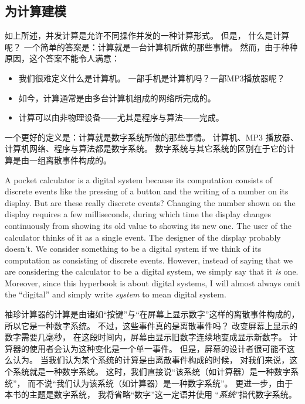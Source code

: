 \documentclass[fleqn,leqno]{article}
\begin{document}
\begin{ch}
\subsection{为计算建模} \label{sec:computing-devices}

如上所述，并发计算是允许不同操作并发的一种计算形式。
但是，
%
什么是计算呢？
一个简单的答案是：计算就是一台计算机所做的那些事情。
然而，由于种种原因，这个答案不能令人满意：
\begin{itemize}
  \item 我们很难定义什么是计算机。
    一部手机是计算机吗？一部MP3播放器呢？
  \item 如今，计算通常是由多台计算机组成的网络所完成的。
  \item 计算可以由非物理设备——尤其是程序与算法——完成。
\end{itemize}
一个更好的定义是：计算就是数字系统所做的那些事情。
计算机、MP3 播放器、计算机网络、程序与算法都是数字系统。
数字系统与其它系统的区别在于它的计算是由一组离散事件构成的。
\end{ch}

\begin{en}
A pocket calculator is a digital system because its computation
consists of discrete events like the pressing of a button and the
writing of a number on its display.  But are these really discrete
events?  Changing the number shown on the display requires a few
milliseconds, during which time the display changes continuously from
showing its old value to showing its new one.  The user of the
calculator thinks of it as a single event.  The designer of the
display probably doesn't.  We consider something to be a digital
system if we think of its computation as consisting of discrete
events.  However, instead of saying that we are considering the
calculator to be a digital system, we simply say that it \emph{is}
one.  Moreover, since this hyperbook is about digital systems, I will
almost always omit the ``digital'' and simply write 
\emph{system} to mean digital system.
\end{en}

\begin{ch}
  袖珍计算器的计算是由诸如``按键''与``在屏幕上显示数字''这样的离散事件构成的，
  所以它是一种数字系统。
  不过，这些事件真的是离散事件吗？
  改变屏幕上显示的数字需要几毫秒，
  在这段时间内，屏幕由显示旧数字连续地变成显示新数字。
  计算器的使用者会认为这种变化是一个单一事件。
  但是，屏幕的设计者很可能不这么认为。
  当我们认为某个系统的计算是由离散事件构成的时候，
  对我们来说，这个系统就是一种数字系统。
  这时，我们直接说``该系统（如计算器）是一种数字系统''，
  而不说``我们认为该系统（如计算器）是一种数字系统''。
  更进一步，由于本书的主题是数字系统，
  我将省略``数字''这一定语并使用%
  ``\emph{系统}''指代数字系统。
\end{ch}
\end{document}
